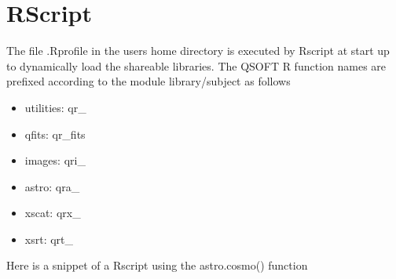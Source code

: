 \documentclass[letterpaper,10pt,english]{sphinxmanual}
\begin{document}
%
\begin{sphinxVerbatim}[commandchars=\\\{\}]
   
 
   
\end{sphinxVerbatim}


\section{RScript}
\label{\detokenize{using_py_R_IDL:rscript}}
The file .Rprofile in the users home directory is executed by Rscript at start
up to dynamically load the shareable libraries. The QSOFT R function names
are prefixed according to the module library/subject as follows
\begin{itemize}
\item {} 
utilities: qr\_

\item {} 
qfits: qr\_fits

\item {} 
images: qri\_

\item {} 
astro: qra\_

\item {} 
xscat: qrx\_

\item {} 
xsrt: qrt\_

\end{itemize}

Here is a snippet of a Rscript using the astro.cosmo() function
\end{document}

